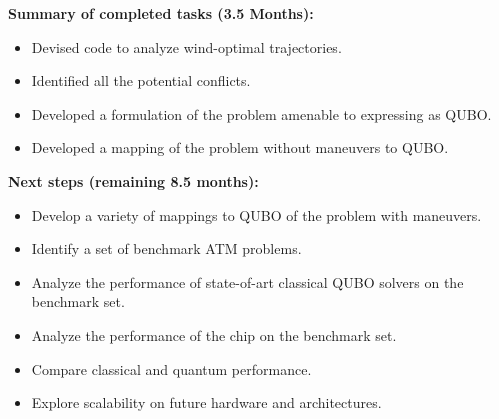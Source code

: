 \begin{center}
\colorbox{gray!20}{
  \begin{minipage}[t]{0.9\columnwidth}
    \textbf{Summary of completed tasks (3.5 Months):}
      \begin{itemize}[leftmargin=0.5cm]
        \itemsep-0.5em
        \item Devised code to analyze wind-optimal trajectories.
        \item Identified all the potential conflicts.
        \item Developed a formulation of the problem amenable to expressing as QUBO.
        \item Developed a mapping of the problem without maneuvers to QUBO.
      \end{itemize}
    \textbf{Next steps (remaining 8.5 months):}
      \begin{itemize}[leftmargin=0.5cm] 
        \itemsep-0.5em
        \item Develop a variety of mappings to QUBO of the problem with maneuvers.
        \item Identify a set of benchmark ATM problems.
        \item Analyze the performance of state-of-art classical QUBO solvers on the benchmark set.
        \item Analyze the performance of the \DW chip on the benchmark set.
        \item Compare classical and quantum performance.
        \item Explore scalability on future hardware and architectures.
      \end{itemize}
 \end{minipage}
}
\end{center}
